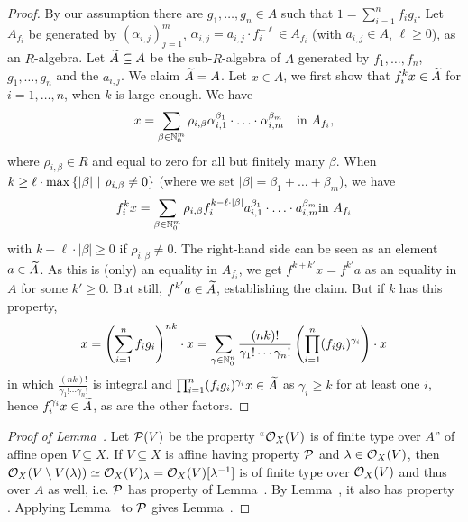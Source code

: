 \documentclass[a4paper,parskip=half,numbers=enddot, DIV=12]{scrreprt}
\begin{document}
\begin{proof}
    By our assumption there are $g_1,\ldots,g_n\in A$ such that $1=\sum_{i=1}^n f_ig_i$. Let $A_{f_i}$ be generated by $(\alpha_{i,j})_{j=1}^m$, $\alpha_{i,j} = a_{i,j}\cdot f_i^{-\ell}\in A_{f_i}$ (with $a_{i,j}\in A$, $\ell\geq0$), as an $R$-algebra. Let $\snake A\subseteq A$ be the sub-$R$-algebra of $A$ generated by $f_1,\ldots,f_n$, $g_1,\ldots,g_n$ and the  $a_{i,j}$. We claim $\snake A = A$. Let $x\in A$, we first show that $f_i^kx \in \snake A$ for $i=1,\ldots, n$, when $k$ is large enough. We have 
    \begin{align*}
        x = \sum_{\beta \in \mathbb{N}_0^m} \rho_{i,\beta} \alpha_{i,1}^{\beta_1}\cdot\ldots\cdot \alpha_{i,m}^{\beta_m}\quad\text{in }A_{f_i}\text{,}
    \end{align*}
    where $\rho_{i,\beta}\in R$ and equal to zero for all but finitely many $\beta$. When $k\geq \ell\cdot \max\left\{|\beta|\ \middle|\  \rho_{i,\beta}\neq 0\right\}$ (where we set $|\beta|=\beta_1+\ldots+\beta_m$), we have
    \begin{align*}
        f_i^kx = \sum_{\beta \in \mathbb{N}_0^m} \rho_{i,\beta}f_i^{k-\ell\cdot|\beta|} a_{i,1}^{\beta_1}\cdot\ldots\cdot a_{i,m}^{\beta_m}\text{in }A_{f_i}
    \end{align*}
    with $k-\ell\cdot|\beta|\geq 0$ if $\rho_{i,\beta}\neq 0$. The right-hand side can be seen as an element $a\in\snake{A}$. As this is (only) an equality in $A_{f_i}$, we get $f^{k+k'}x=f^{k'}a$ as an equality in $A$ for some $k'\geq0$. But still, $f^{k'}a\in\snake{A}$, establishing the claim. But if $k$ has this property,
    \begin{align*}
        x = \left(\sum_{i=1}^n f_ig_i\right)^{nk}\cdot x= \sum_{\gamma\in\mathbb{N}_0^n} \frac{(nk)!}{\gamma_1!\cdots\gamma_n!} \left(\prod_{i=1}^n (f_ig_i)^{\gamma_i}\right)\cdot x
    \end{align*}
    in which $\frac{(nk)!}{\gamma_1!\cdots\gamma_n!}$ is integral and $\prod_{i=1}^n (f_ig_i)^{\gamma_i}x\in \snake A$ as $\gamma_i\geq k$ for at least one $i$, hence $f_i^{\gamma_i}x\in\snake A$, as are the other factors.
\end{proof}

\begin{proof}[Proof of Lemma~]
    Let $\mathcal{P}(V)$ be the property ``$\mathcal{O}_X(V)$ is of finite type over $A$'' of affine open $V\subseteq X$. If $V\subseteq X$ is affine having property $\mathcal{P}$ and $\lambda\in\mathcal{O}_X(V)$, then $\mathcal{O}_X(V\setminus V(\lambda))\simeq\mathcal{O}_X(V)_\lambda=\mathcal{O}_X(V)[\lambda^{-1}]$ is of finite type over $\mathcal{O}_X(V)$ and thus over $A$ as well, i.e. $\mathcal{P}$ has property \itememph{\alpha} of Lemma~. By Lemma~, it also has property \itememph{\beta}. Applying Lemma~ to $\mathcal{P}$ gives Lemma~.
\end{proof}
\end{document}
